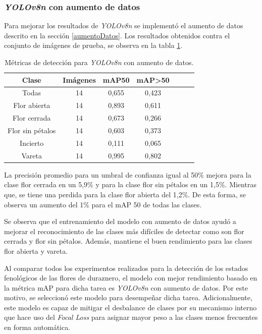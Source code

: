 \subsubsection{\textit{YOLOv8n} con aumento de datos}
\label{YOLOv8n con aumento de dato}

Para mejorar los resultados de \textit{YOLOv8n} se implementó el aumento de datos descrito en la sección \ref{aumentoDatos}. Los resultados obtenidos contra el conjunto de imágenes de prueba, se observa en la tabla \ref{tab:resultadosYoloConAug}.

\begin{table}[h]
	\centering
	\caption{Métricas de detección para \textit{YOLOv8n} con aumento de datos.}
	\begin{tabular}{c c c c c c c}    
		\toprule
		\textbf{Clase}&\textbf{Imágenes}&\textbf{mAP50}&\textbf{mAP>50}\\
		\midrule
		Todas & 14 & 0,655 & 0,423\\
		Flor abierta & 14 & 0,893 & 0,611 \\
		Flor cerrada & 14 & 0,673 & 0,266 \\
		Flor sin pétalos & 14 & 0,603 & 0,373 \\
		Incierto & 14 & 0,111 & 0,065 \\
		Vareta & 14 & 0,995 & 0,802 \\		
		\bottomrule
		\hline
	\end{tabular}
	\label{tab:resultadosYoloConAug}
\end{table}

La precisión promedio para un umbral de confianza igual al 50\% mejora para la clase flor cerrada en un 5,9\% y para la clase flor sin pétalos en un 1,5\%. Mientras que, se tiene una perdida para la clase flor abierta del 1,2\%. De esta forma, se observa un aumento del 1\% para el mAP 50 de todas las clases.

Se observa que el entrenamiento del modelo con aumento de datos ayudó a mejorar el reconocimiento de las clases más difíciles de detectar como son flor cerrada y flor sin pétalos. Además, mantiene el buen rendimiento para las clases flor abierta y vareta.

Al comparar todos los experimentos realizados para la detección de los estados fenológicos de las flores de duraznero, el modelo con mejor rendimiento basado en la métrica mAP para dicha tarea es \textit{YOLOv8n} con aumento de datos. Por este motivo, se seleccionó este modelo para desempeñar dicha tarea. Adicionalmente, este modelo es capaz de mitigar el desbalance de clases por su mecanismo interno que hace uso del \textit{Focal Loss} \cite{ARTICLE:15} para asignar mayor peso a las clases menos frecuentes en forma automática. 

